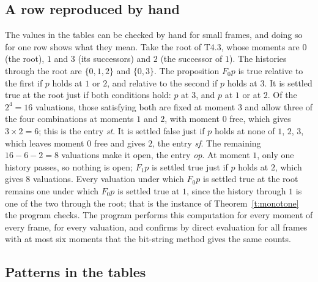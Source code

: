 \documentclass{situationist-preprint}
\begin{document}
\subsection{A row reproduced by hand}

The values in the tables can be checked by hand for small frames, and doing so for one row shows what they mean. Take the root of T4.3, whose moments are $0$ (the root), $1$ and $3$ (its successors) and $2$ (the successor of $1$). The histories through the root are $\{0, 1, 2\}$ and $\{0, 3\}$. The proposition $F_0 p$ is true relative to the first if $p$ holds at $1$ or $2$, and relative to the second if $p$ holds at $3$. It is settled true at the root just if both conditions hold: $p$ at $3$, and $p$ at $1$ or at $2$. Of the $2^4 = 16$ valuations, those satisfying both are fixed at moment $3$ and allow three of the four combinations at moments $1$ and $2$, with moment $0$ free, which gives $3 \times 2 = 6$; this is the entry \emph{st}. It is settled false just if $p$ holds at none of $1$, $2$, $3$, which leaves moment $0$ free and gives $2$, the entry \emph{sf}. The remaining $16 - 6 - 2 = 8$ valuations make it open, the entry \emph{op}. At moment $1$, only one history passes, so nothing is open; $F_1 p$ is settled true just if $p$ holds at $2$, which gives $8$ valuations. Every valuation under which $F_0 p$ is settled true at the root remains one under which $F_0 p$ is settled true at $1$, since the history through $1$ is one of the two through the root; that is the instance of Theorem~\ref{t:monotone} the program checks. The program performs this computation for every moment of every frame, for every valuation, and confirms by direct evaluation for all frames with at most six moments that the bit-string method gives the same counts.

\subsection{Patterns in the tables}
\end{document}
